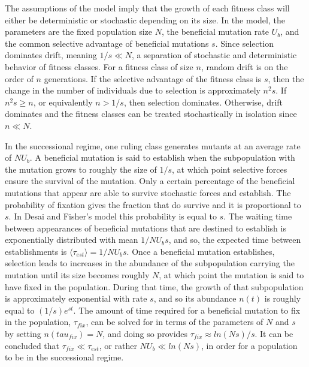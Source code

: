 \documentclass[12pt, one column]{article}
\begin{document}
The assumptions of the model imply that the growth of each fitness class will either be deterministic or stochastic depending on its size.  In the model, the parameters are the fixed population size $N$, the beneficial mutation rate $U_b$, and the common selective advantage of beneficial mutations $s$.  Since selection dominates drift, meaning $1/s \ll N$, a separation of stochastic and deterministic behavior of fitness classes.  For a fitness class of size $n$, random drift is on the order of $n$ generations.  If the selective advantage of the fitness class is $s$, then the change in the number of individuals due to selection is approximately $n^2s$.  If $n^2s \ge n$, or equivalently $n>1/s$, then selection dominates.  Otherwise, drift dominates and the fitness classes can be treated stochastically in isolation since $n \ll N$.  

In the successional regime, one ruling class generates mutants at an average rate of $N U_b$.  A beneficial mutation is said to establish when the subpopulation with the mutation grows to roughly the size of $1/s$, at which point selective forces ensure the survival of the mutation.  Only a certain percentage of the beneficial mutations that appear are able to survive stochastic forces and establish.  The probability of fixation gives the fraction that do survive and it is proportional to $s$.  In Desai and Fisher's model this probability is equal to $s$.  The waiting time between appearances of beneficial mutations that are destined to establish is exponentially distributed with mean $1/NU_b s$, and so, the expected time between establishments is $\langle \tau_{est} \rangle = 1/NU_b s$.  Once a beneficial mutation establishes, selection leads to increases in the abundance of the subpopulation carrying the mutation until its size becomes roughly $N$, at which point the mutation is said to have fixed in the population.  During that time, the growth of that subpopulation is approximately exponential with rate $s$, and so its abundance $n(t)$ is roughly equal to $(1/s) e^{st}$.  The amount of time required for a beneficial mutation to fix in the population, $\tau_{fix}$, can be solved for in terms of the parameters of $N$ and $s$ by setting $n(tau_{fix})=N$, and doing so provides $\tau_{fix} \approx ln(Ns)/s$.  It can be concluded that $\tau_{fix} \ll \tau_{est}$, or rather $N U_b \ll ln(Ns)$, in order for a population to be in the successional regime. 
\end{document}
